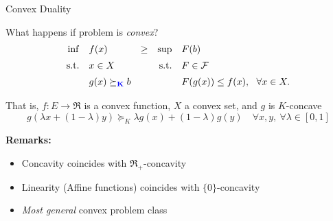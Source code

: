 \documentclass[9pt]{beamer}
\begin{document}
\begin{frame}{Convex Duality}

  What happens if problem is \emph{convex}?
  \[
    \begin{array}{rlcrl}
      \inf & f(x)  & \geq & \sup & F(b) \\[0.5em]
      \mathrm{s.t.} & x\in X   & &                       \mathrm{s.t.} & F \in \mathcal F \\[0.5em]
           & g(x) \succeq_{{\bf {\color{blue} K}}} b &&    & F(g(x)) \leq f(x), ~~\forall x \in X.
    \end{array}
  \]

  That is, $f:E\to\Re$ is a convex function, $X$ a convex set, and $g$ is $K$-concave
  \[
    g(\lambda x + (1-\lambda)y) \succeq_{K} \lambda g(x) + (1-\lambda) g(y) \quad \forall x, y, ~\forall \lambda \in [0, 1]
  \]

  \vfill
  \textbf{Remarks:}
  \begin{itemize}
  \item Concavity coincides with $\Re_+$-concavity
  \item Linearity (Affine functions) coincides with $\{0\}$-concavity
  \item \emph{Most general} convex problem class
  \end{itemize}
  
\end{frame}
\end{document}
